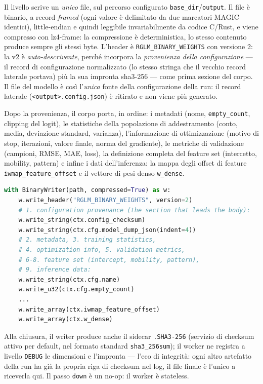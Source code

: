 Il livello scrive un \emph{unico} file, sul percorso configurato
\texttt{base\_dir}/\texttt{output}. Il file è binario, a record
\emph{framed} (ogni valore è delimitato da due marcatori MAGIC
identici), little-endian e quindi leggibile invariabilmente da codice
C/Rust, e viene compresso con lz4-frame: la compressione è deterministica,
lo stesso contenuto produce sempre gli stessi byte. L'header è
\texttt{RGLM\_BINARY\_WEIGHTS} con versione 2: la v2 è
\emph{auto-descrivente}, perché incorpora la \emph{provenienza della
configurazione} — il record di configurazione normalizzato (lo stesso
stringa che il vecchio record laterale portava) più la sua impronta
sha3-256 — come prima sezione del corpo. Il file del modello è così
l'\emph{unica} fonte della configurazione della run: il record laterale
(\texttt{<output>.config.json}) è ritirato e non viene più generato.

Dopo la provenienza, il corpo porta, in ordine: i metadati (nome,
\texttt{empty\_count}, clipping del logit), le statistiche della
popolazione di addestramento (conto, media, deviazione standard,
varianza), l'informazione di ottimizzazione (motivo di stop, iterazioni,
valore finale, norma del gradiente), le metriche di validazione (campioni,
RMSE, MAE, loss), la definizione completa del feature set (intercetto,
mobility, pattern) e infine i dati dell'inferenza: la mappa degli offset di
feature \texttt{iwmap\_feature\_offset} e il vettore di pesi denso
\texttt{w\_dense}.

\begin{lstlisting}[language=python,
caption={L'ordine di scrittura del file (estratto di \texttt{model\_weights\_write\_file}).}]
with BinaryWriter(path, compressed=True) as w:
    w.write_header("RGLM_BINARY_WEIGHTS", version=2)
    # 1. configuration provenance (the section that leads the body):
    w.write_string(ctx.config_checksum)
    w.write_string(ctx.cfg.model_dump_json(indent=4))
    # 2. metadata, 3. training statistics,
    # 4. optimization info, 5. validation metrics,
    # 6-8. feature set (intercept, mobility, pattern),
    # 9. inference data:
    w.write_string(ctx.cfg.name)
    w.write_u32(ctx.cfg.empty_count)
    ...
    w.write_array(ctx.iwmap_feature_offset)
    w.write_array(ctx.w_dense)
\end{lstlisting}

Alla chiusura, il writer produce anche il sidecar \texttt{.SHA3-256}
(servizio di checksum attivo per default, nel formato standard
\texttt{sha3\_256sum}); il worker ne registra a livello \texttt{DEBUG} le
dimensioni e l'impronta — l'eco di integrità: ogni altro artefatto della
run ha già la propria riga di checksum nel log, il file finale è l'unico a
riceverla qui. Il passo \texttt{down} è un no-op: il worker è stateless.


